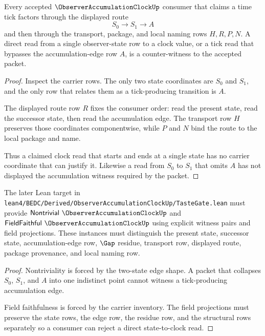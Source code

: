 \begin{theorem}
\label{thm:observer-accumulation-clock-falsifiable-boundary}
Every accepted $\ObserverAccumulationClockUp$ consumer that claims a time tick factors through the displayed route
$$
S_0 \to S_1 \to A
$$
and then through the transport, package, and local naming rows $H,R,P,N$. A direct read from a single observer-state row to a clock value, or a tick read that bypasses the accumulation-edge row $A$, is a counter-witness to the accepted packet.
\end{theorem}
\begin{proof}
Inspect the carrier rows. The only two state coordinates are $S_0$ and $S_1$, and the only row that relates them as a tick-producing transition is $A$.

The displayed route row $R$ fixes the consumer order: read the present state, read the successor state, then read the accumulation edge. The transport row $H$ preserves those coordinates componentwise, while $P$ and $N$ bind the route to the local package and name.

Thus a claimed clock read that starts and ends at a single state has no carrier coordinate that can justify it. Likewise a read from $S_0$ to $S_1$ that omits $A$ has not displayed the accumulation witness required by the packet.
\end{proof}

\begin{theorem}
\label{thm:observer-accumulation-clock-tastegate-obligation}
The later Lean target in \texttt{lean4/BEDC/Derived/ObserverAccumulationClockUp/TasteGate.lean} must provide $\mathsf{Nontrivial}\ \ObserverAccumulationClockUp$ and $\mathsf{FieldFaithful}\ \ObserverAccumulationClockUp$ using explicit witness pairs and field projections. These instances must distinguish the present state, successor state, accumulation-edge row, $\Gap$ residue, transport row, displayed route, package provenance, and local naming row.
\end{theorem}
\begin{proof}
Nontriviality is forced by the two-state edge shape. A packet that collapses $S_0$, $S_1$, and $A$ into one indistinct point cannot witness a tick-producing accumulation edge.

Field faithfulness is forced by the carrier inventory. The field projections must preserve the state rows, the edge row, the residue row, and the structural rows separately so a consumer can reject a direct state-to-clock read.
\end{proof}

